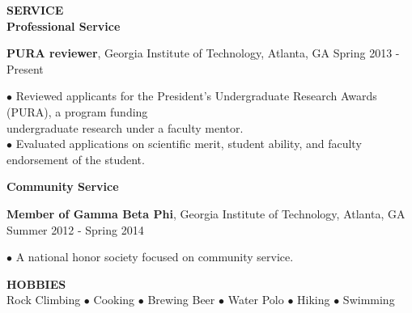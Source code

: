\documentclass[10pt]{article}
\newenvironment{changemargin}[2]{%
  \list{}{\rightmargin#2\leftmargin#1
    \parsep=0pt\topsep=1pt\partopsep=0pt}
\item[]} {\endlist}
\newenvironment{indentmore}{\begin{changemargin}{10pt}{0cm}}{\end{changemargin}}
\begin{document}
\textbf{\large SERVICE}\\
{\bf Professional Service}
\begin{indentmore}
{\bf PURA reviewer}, Georgia Institute of Technology, Atlanta, GA \hfill Spring 2013 - Present
\begin{indentmore}
$\bullet$ Reviewed applicants for the President's Undergraduate Research Awards (PURA), a program funding \\ \hspace*{5pt} undergraduate research under a faculty mentor.\\
$\bullet$ Evaluated applications on scientific merit, student ability, and faculty endorsement of the student.\\
\end{indentmore}
\end{indentmore}


{\bf Community Service} 
\begin{indentmore}
{\bf Member of Gamma Beta Phi}, Georgia Institute of Technology, Atlanta, GA \hfill Summer 2012 - Spring 2014
\begin{indentmore}
$\bullet$ A national honor society focused on community service. \\
\end{indentmore}
\end{indentmore}

\textbf{\large HOBBIES} \\
 Rock Climbing $\bullet$ Cooking $\bullet$ Brewing Beer $\bullet$ Water Polo $\bullet$ Hiking $\bullet$ Swimming
\end{document}

